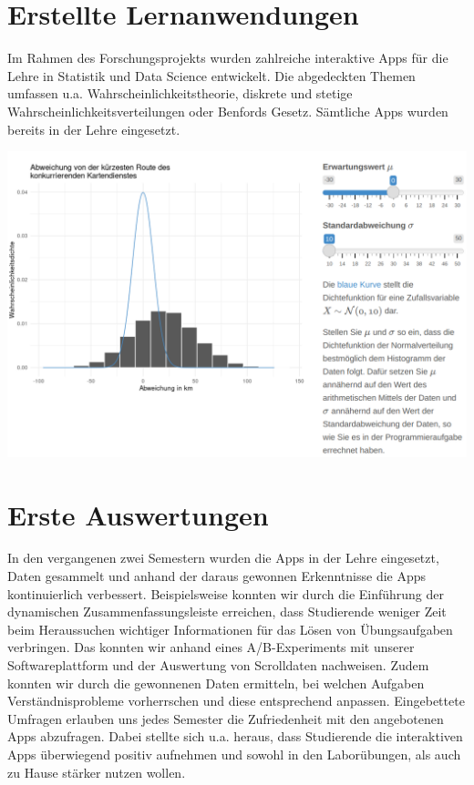 \documentclass[a0,portrait]{a0poster}
\begin{document}
\begin{multicols}{2}
\section*{Erstellte Lernanwendungen}

Im Rahmen des Forschungsprojekts wurden zahlreiche interaktive Apps für die Lehre in Statistik und Data Science entwickelt. Die abgedeckten Themen umfassen u.a. Wahrscheinlichkeitstheorie, diskrete und stetige Wahrscheinlichkeitsverteilungen oder Benfords Gesetz. Sämtliche Apps wurden bereits in der Lehre eingesetzt.

\begin{center}\vspace{1cm}
\includegraphics[width=0.6\linewidth]{wvstetig}
\end{center}\vspace{1cm}

\section*{Erste Auswertungen}

In den vergangenen zwei Semestern wurden die Apps in der Lehre eingesetzt, Daten gesammelt und anhand der daraus gewonnen Erkenntnisse die Apps kontinuierlich verbessert. Beispielsweise konnten wir durch die Einführung der dynamischen Zusammenfassungsleiste erreichen, dass Studierende weniger Zeit beim Heraussuchen wichtiger Informationen für das Lösen von Übungsaufgaben verbringen. Das konnten wir anhand eines A/B-Experiments mit unserer Softwareplattform und der Auswertung von Scrolldaten nachweisen. Zudem konnten wir durch die gewonnenen Daten ermitteln, bei welchen Aufgaben Verständnisprobleme vorherrschen und diese entsprechend anpassen. Eingebettete Umfragen erlauben uns jedes Semester die Zufriedenheit mit den angebotenen Apps abzufragen. Dabei stellte sich u.a. heraus, dass Studierende die interaktiven Apps überwiegend positiv aufnehmen und sowohl in den Laborübungen, als auch zu Hause stärker nutzen wollen.


\end{multicols}
\end{document}
